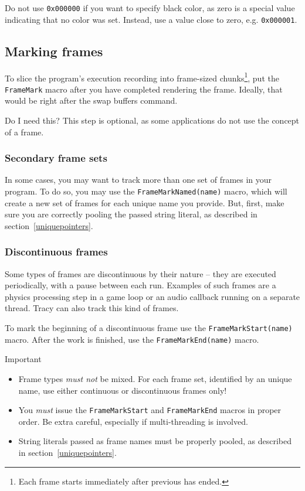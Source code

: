 \documentclass[hidelinks,titlepage,a4paper]{article}
\begin{document}
Do not use \texttt{0x000000} if you want to specify black color, as zero is a special value indicating that no color was set. Instead, use a value close to zero, e.g. \texttt{0x000001}.

\subsection{Marking frames}
\label{markingframes}

To slice the program's execution recording into frame-sized chunks\footnote{Each frame starts immediately after previous has ended.}, put the \texttt{FrameMark} macro after you have completed rendering the frame. Ideally, that would be right after the swap buffers command.

\begin{bclogo}[
noborder=true,
couleur=black!5,
logo=\bclampe
]{Do I need this?}
This step is optional, as some applications do not use the concept of a frame.
\end{bclogo}

\subsubsection{Secondary frame sets}
\label{secondaryframeset}

In some cases, you may want to track more than one set of frames in your program. To do so, you may use the \texttt{FrameMarkNamed(name)} macro, which will create a new set of frames for each unique name you provide. But, first, make sure you are correctly pooling the passed string literal, as described in section~\ref{uniquepointers}.

\subsubsection{Discontinuous frames}

Some types of frames are discontinuous by their nature -- they are executed periodically, with a pause between each run. Examples of such frames are a physics processing step in a game loop or an audio callback running on a separate thread. Tracy can also track this kind of frames.

To mark the beginning of a discontinuous frame use the \texttt{FrameMarkStart(name)} macro. After the work is finished, use the \texttt{FrameMarkEnd(name)} macro.

\begin{bclogo}[
noborder=true,
couleur=black!5,
logo=\bcbombe
]{Important}
\begin{itemize}
\item Frame types \emph{must not} be mixed. For each frame set, identified by an unique name, use either continuous or discontinuous frames only!
\item You \emph{must} issue the \texttt{FrameMarkStart} and \texttt{FrameMarkEnd} macros in proper order. Be extra careful, especially if multi-threading is involved.
\item String literals passed as frame names must be properly pooled, as described in section~\ref{uniquepointers}.
\end{itemize}
\end{bclogo}
\end{document}
